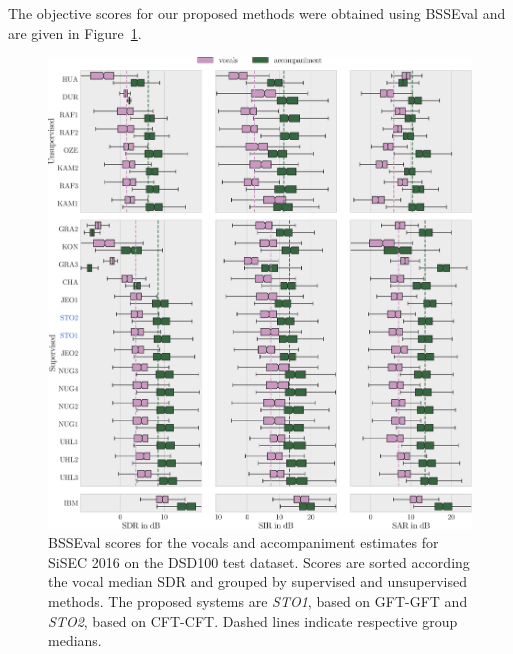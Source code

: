 The objective scores for our proposed methods were obtained using BSSEval and are given in Figure~\ref{fig:eval}.

\begin{figure}[htbp]
    \includegraphics[width=1.1\textwidth]{Chapters/06_Separation_Unknown/figures/evaluation.pdf}
    \caption{BSSEval scores for the vocals and accompaniment estimates for \acs{SiSEC} 2016 on the DSD100 test dataset. Scores are sorted according the vocal median \acs{SDR} and grouped by supervised and unsupervised methods. The proposed systems are \emph{STO1}, based on GFT-GFT and \emph{STO2}, based on CFT-CFT. Dashed lines indicate respective group medians.}
    \label{fig:eval}
\end{figure}

